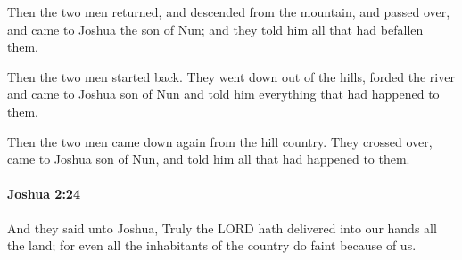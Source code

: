 			\begin{versebox}
					\item[BHS] 
					\item[ASV] Then the two men returned, and descended from the mountain, and passed over, and came to Joshua the son of Nun; and they told him all that had befallen them.
					\item[NIV] Then the two men started back. They went down out of the hills, forded the river and came to Joshua son of Nun and told him everything that had happened to them.
					\item[NRSV] Then the two men came down again from the hill country. They crossed over, came to Joshua son of Nun, and told him all that had happened to them.
			\end{versebox}

		\paragraph{Joshua 2:24} %
			\label{JOSHUA-2-24}

			And they said unto Joshua, Truly the LORD hath delivered into our hands all the land; for even all the inhabitants of the country do faint because of us.

